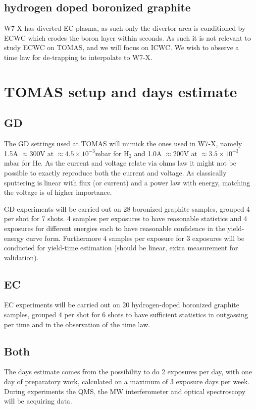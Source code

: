 \documentclass{article}
\begin{document}
\subsection*{hydrogen doped boronized graphite}
W7-X has diverted EC plasma, as such only the divertor area
is conditioned by ECWC which erodes the boron layer within seconds.
As such it is not relevant to study ECWC on TOMAS, and we will focus on
ICWC.
We wish to observe a time law for de-trapping to interpolate to W7-X.
\section{TOMAS setup and days estimate}
\subsection*{GD}
The GD settings used at TOMAS will mimick the ones used in W7-X, namely 1.5A
$\approx300$V at $\approx4.5\times10^{-3}$mbar  for H$_2$ and 1.0A $\approx
200$V at $\approx 3.5\times10^{-3}$mbar for He\cite{AndreiNucMatEn}.  As the
current and voltage relate via ohms law it might not be possible to exactly
reproduce both the current and voltage. As classically sputtering is linear
with flux (or current) and a power law with energy, matching the voltage is 
of higher importance.

GD experiments will be carried out on 28 boronized graphite samples, grouped 4
per shot for 7 shots. 4 samples per exposures to have reasonable statistics and
4 exposures for different energies each to have reasonable confidence in the
yield-energy curve form.  Furthermore 4 samples per exposure for 3 exposures
will be conducted for yield-time estimation (should be linear, extra
measurement for validation).
\subsection*{EC}
EC experiments will be carried out on 20 hydrogen-doped boronized graphite
samples, grouped 4 per shot for 6 shots to have sufficient statistics
in outgassing per time and in the observation of the time law.
\subsection*{Both}
The days estimate comes from the possibility to do 2 exposures per day,
with one day of preparatory work, calculated on a maximum of 3 exposure days per week.
During experiments the QMS, the MW interferometer and optical spectroscopy will
be acquiring data.
\end{document}
